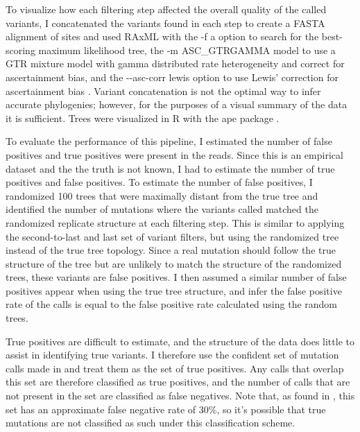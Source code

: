 To visualize how each filtering step affected the overall quality of the called variants, I concatenated the variants found in each step to create a FASTA alignment of sites and used RAxML \parencite{stamatakis_raxml_2014} with the -f a option to search for the best-scoring maximum likelihood tree, the -m ASC\_GTRGAMMA model to use a GTR mixture model with gamma distributed rate heterogeneity and correct for ascertainment bias, and the -\phantom{}-asc-corr lewis option to use Lewis' correction for ascertainment bias \parencite{lewis_likelihood_2001}. Variant concatenation is not the optimal way to infer accurate phylogenies; however, for the purposes of a visual summary of the data it is sufficient. Trees were visualized in R \parencite{r_core_2020} with the ape package \parencite{paradis_ape_2019}.

To evaluate the performance of this pipeline, I estimated the number of false positives and true positives were present in the reads. Since this is an empirical dataset and the the truth is not known, I had to estimate the number of true positives and false positives. To estimate the number of false positives, I randomized 100 trees that were maximally distant from the true tree and identified the number of mutations where the variants called matched the randomized replicate structure at each filtering step. This is similar to applying the second-to-last and last set of variant filters, but using the randomized tree instead of the true tree topology. Since a real mutation should follow the true structure of the tree but are unlikely to match the structure of the randomized trees, these variants are false positives. I then assumed a similar number of false positives appear when using the true tree structure, and infer the false positive rate of the calls is equal to the false positive rate calculated using the random trees.  %

True positives are difficult to estimate, and the structure of the data does little to assist in identifying true variants. I therefore use the confident set of mutation calls made in \cite{orr_phylogenomic_2020} and treat them as the set of true positives. Any calls that overlap this set are therefore classified as true positives, and the number of calls that are not present in the set are classified as false negatives. Note that, as found in \cite{orr_phylogenomic_2020}, this set has an approximate false negative rate of 30\%, so it's possible that true mutations are not classified as such under this classification scheme.

